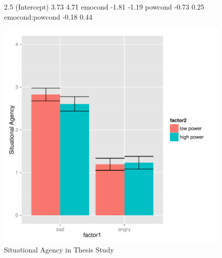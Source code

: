 \documentclass[man,apacite,floatsintext]{apa6}
\begin{document}
\begin{figure}
\begin{Schunk}
\begin{Soutput}
                2.5 %
(Intercept)      3.73   4.71
emocond         -1.81  -1.19
powcond         -0.73   0.25
emocond:powcond -0.18   0.44
\end{Soutput}
\end{Schunk}
\includegraphics{PowerResults-ThesisSitAg}
\caption{Situational Agency in Thesis Study}
\end{figure}
\newpage
\end{document}
